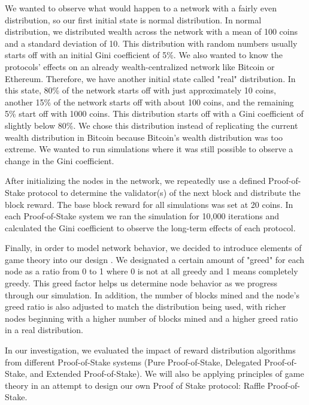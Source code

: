 We wanted to observe what would happen to a network with a fairly even distribution, so our first initial state is normal distribution. In normal distribution, we distributed wealth across the network with a mean of 100 coins and a standard deviation of 10. This distribution with random numbers usually starts off with an initial Gini coefficient of 5\%. We also wanted to know the protocols' effects on an already wealth-centralized network like Bitcoin or Ethereum. Therefore, we have another initial state called "real" distribution. In this state, 80\% of the network starts off with just approximately 10 coins, another 15\% of the network starts off with about 100 coins, and the remaining 5\% start off with 1000 coins. This distribution starts off with a Gini coefficient of slightly below 80\%. We chose this distribution instead of replicating the current wealth distribution in Bitcoin because Bitcoin's wealth distribution was too extreme. We wanted to run simulations where it was still possible to observe a change in the Gini coefficient.

After initializing the nodes in the network, we repeatedly use a defined Proof-of-Stake protocol to determine the validator(s) of the next block and distribute the block reward. The base block reward for all simulations was set at 20 coins. In each Proof-of-Stake system we ran the simulation for 10,000 iterations and calculated the Gini coefficient to observe the long-term effects of each protocol.

Finally, in order to model network behavior, we decided to introduce elements of game theory into our design \cite{CRYPTO:3}. We designated a certain amount of "greed" for each node as a ratio from 0 to 1 where 0 is not at all greedy and 1 means completely greedy. This greed factor helps us determine node behavior as we progress through our simulation. In addition, the number of blocks mined and the node's greed ratio is also adjusted to match the distribution being used, with richer nodes beginning with a higher number of blocks mined and a higher greed ratio in a real distribution.

In our investigation, we evaluated the impact of reward distribution algorithms from different Proof-of-Stake systems (Pure Proof-of-Stake, Delegated Proof-of-Stake, and Extended Proof-of-Stake). We will also be applying principles of game theory in an attempt to design our own Proof of Stake protocol: Raffle Proof-of-Stake.

